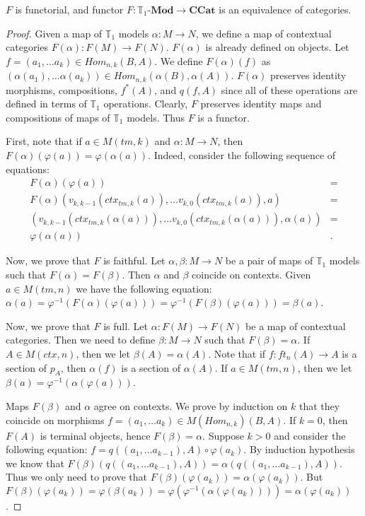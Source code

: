 \documentclass{elsarticle}
\theoremstyle{definition}
\theoremstyle{remark}
\newcommand{\cat}[1]{\mathbf{#1}}
\newcommand{\ccat}{\cat{CCat}}
\newcommand{\Mod}[1]{#1\text{-}\cat{Mod}}
\numberwithin{figure}{section}
\begin{document}
\begin{prop}[T1-CCat]
$F$ is functorial, and functor $F : \Mod{\mathbb{T}_1} \to \ccat$ is an equivalence of categories.
\end{prop}
\begin{proof}
Given a map of $\mathbb{T}_1$ models $\alpha : M \to N$, we define a map of contextual categories $F(\alpha) : F(M) \to F(N)$.
$F(\alpha)$ is already defined on objects.
Let $f = (a_1, \ldots a_k) \in Hom_{n,k}(B,A)$.
We define $F(\alpha)(f)$ as $(\alpha(a_1), \ldots \alpha(a_k)) \in Hom_{n,k}(\alpha(B), \alpha(A))$.
$F(\alpha)$ preserves identity morphisms, compositions, $f^*(A)$, and $q(f,A)$ since all of these operations are defined in terms of $\mathbb{T}_1$ operations.
Clearly, $F$ preserves identity maps and compositions of maps of $\mathbb{T}_1$ models.
Thus $F$ is a functor.

First, note that if $a \in M(tm,k)$ and $\alpha : M \to N$, then $F(\alpha)(\varphi(a)) = \varphi(\alpha(a))$.
Indeed, consider the following sequence of equations:
\begin{align*}
F(\alpha)(\varphi(a)) & = \\
F(\alpha)(v_{k,k-1}(ctx_{tm,k}(a)), \ldots v_{k,0}(ctx_{tm,k}(a)), a) & = \\
(v_{k,k-1}(ctx_{tm,k}(\alpha(a))), \ldots v_{k,0}(ctx_{tm,k}(\alpha(a))), \alpha(a)) & = \\
\varphi(\alpha(a)) & .
\end{align*}

Now, we prove that $F$ is faithful.
Let $\alpha,\beta : M \to N$ be a pair of maps of $\mathbb{T}_1$ models such that $F(\alpha) = F(\beta)$.
Then $\alpha$ and $\beta$ coincide on contexts.
Given $a \in M(tm,n)$ we have the following equation: $\alpha(a) = \varphi^{-1}(F(\alpha)(\varphi(a))) = \varphi^{-1}(F(\beta)(\varphi(a))) = \beta(a)$.

Now, we prove that $F$ is full.
Let $\alpha : F(M) \to F(N)$ be a map of contextual categories.
Then we need to define $\beta : M \to N$ such that $F(\beta) = \alpha$.
If $A \in M(ctx,n)$, then we let $\beta(A) = \alpha(A)$.
Note that if $f : ft_n(A) \to A$ is a section of $p_A$, then $\alpha(f)$ is a section of $\alpha(A)$.
If $a \in M(tm,n)$, then we let $\beta(a) = \varphi^{-1}(\alpha(\varphi(a)))$.

Maps $F(\beta)$ and $\alpha$ agree on contexts.
We prove by induction on $k$ that they coincide on morphisms $f = (a_1, \ldots a_k) \in M(Hom_{n,k})(B,A)$.
If $k = 0$, then $F(A)$ is terminal objects, hence $F(\beta) = \alpha$.
Suppose $k > 0$ and consider the following equation: $f = q((a_1, \ldots a_{k-1}), A) \circ \varphi(a_k)$.
By induction hypothesis we know that $F(\beta)(q((a_1, \ldots a_{k-1}), A)) = \alpha(q((a_1, \ldots a_{k-1}), A))$.
Thus we only need to prove that $F(\beta)(\varphi(a_k)) = \alpha(\varphi(a_k))$.
But $F(\beta)(\varphi(a_k)) = \varphi(\beta(a_k)) = \varphi(\varphi^{-1}(\alpha(\varphi(a_k)))) = \alpha(\varphi(a_k))$.


\end{proof}
\end{document}
